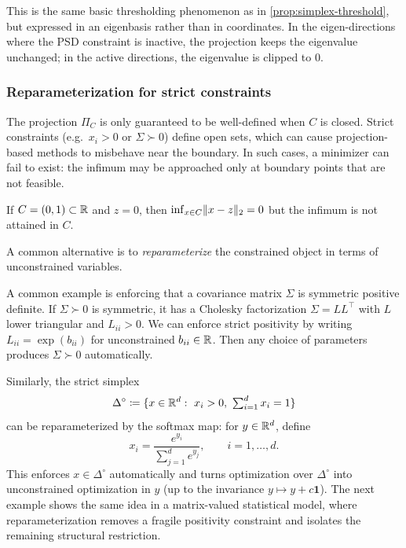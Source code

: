 This is the same basic thresholding phenomenon as in \cref{prop:simplex-threshold}, but expressed in an eigenbasis rather than in coordinates.
In the eigen-directions where the PSD constraint is inactive, the projection keeps the eigenvalue unchanged; in the active directions, the eigenvalue is clipped to $0$.

\subsubsection{Reparameterization for strict constraints}
\label{subsubsec:strict-constraints}

The projection $\Pi_C$ is only guaranteed to be well-defined when $C$ is closed.
Strict constraints (e.g.\ $x_i>0$ or $\Sigma\succ 0$) define open sets, which can cause projection-based methods to misbehave near the boundary.
In such cases, a minimizer can fail to exist: the infimum may be approached only at boundary points that are not feasible.
\begin{example}
If $C=(0,1)\subset\mathbb{R}$ and $z=0$, then $\inf_{x\in C}\lVert x-z\rVert_2=0$ but the infimum is not attained in $C$.
\end{example}
A common alternative is to \emph{reparameterize} the constrained object in terms of unconstrained variables.

A common example is enforcing that a covariance matrix $\Sigma$ is symmetric positive definite.
If $\Sigma\succ 0$ is symmetric, it has a Cholesky factorization $\Sigma=LL^\top$ with $L$ lower triangular and $L_{ii}>0$.
We can enforce strict positivity by writing $L_{ii}=\exp(b_{ii})$ for unconstrained $b_{ii}\in\mathbb{R}$.
Then any choice of parameters produces $\Sigma\succ 0$ automatically.

Similarly, the strict simplex
\[
\Delta^\circ \coloneqq \{x\in\R^d:\ x_i>0,\ \textstyle\sum_{i=1}^d x_i = 1\}
\]
can be reparameterized by the softmax map: for $y\in\mathbb{R}^d$, define
\[
x_i = \frac{e^{y_i}}{\sum_{j=1}^d e^{y_j}},
\qquad i=1,\dots,d.
\]
This enforces $x\in\Delta^\circ$ automatically and turns optimization over $\Delta^\circ$ into unconstrained optimization in $y$ (up to the invariance $y\mapsto y+c\mathbf{1}$).
The next example shows the same idea in a matrix-valued statistical model, where reparameterization removes a fragile positivity constraint and isolates the remaining structural restriction.
\label{subsubsec:gaussian-precision-example}

